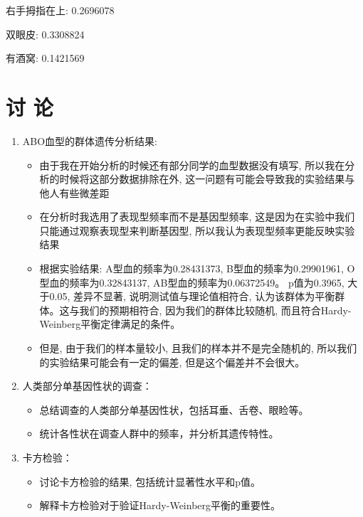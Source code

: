 \documentclass[AutoFakeBold]{LZUThesis}
\begin{document}
\begin{enumerate}
右手拇指在上: 0.2696078

双眼皮: 0.3308824

有酒窝: 0.1421569

\chapter{\texorpdfstring{讨 \quad 论}{讨论}}
\begin{enumerate}
    \item ABO血型的群体遗传分析结果:

    \begin{itemize}
        \item 由于我在开始分析的时候还有部分同学的血型数据没有填写, 所以我在分析的时候将这部分数据排除在外, 这一问题有可能会导致我的实验结果与他人有些微差距

        \item 在分析时我选用了表现型频率而不是基因型频率, 这是因为在实验中我们只能通过观察表现型来判断基因型, 所以我认为表现型频率更能反映实验结果

        \item 根据实验结果: A型血的频率为0.28431373, B型血的频率为0.29901961, O型血的频率为0.32843137, AB型血的频率为0.06372549。
    p值为0.3965, 大于0.05, 差异不显著, 说明测试值与理论值相符合, 认为该群体为平衡群体。这与我们的预期相符合, 因为我们的群体比较随机, 而且符合Hardy-Weinberg平衡定律满足的条件。

        \item  但是, 由于我们的样本量较小, 且我们的样本并不是完全随机的, 所以我们的实验结果可能会有一定的偏差, 但是这个偏差并不会很大。
    \end{itemize}

    \item 人类部分单基因性状的调查：
    
    \begin{itemize}
        \item 总结调查的人类部分单基因性状，包括耳垂、舌卷、眼睑等。

        \item 统计各性状在调查人群中的频率，并分析其遗传特性。
    \end{itemize}
    
    \item 卡方检验：
    
    \begin{itemize}
        \item 讨论卡方检验的结果, 包括统计显著性水平和p值。

        \item 解释卡方检验对于验证Hardy-Weinberg平衡的重要性。
    \end{itemize}
    

\end{enumerate}
\end{enumerate}
\end{document}

